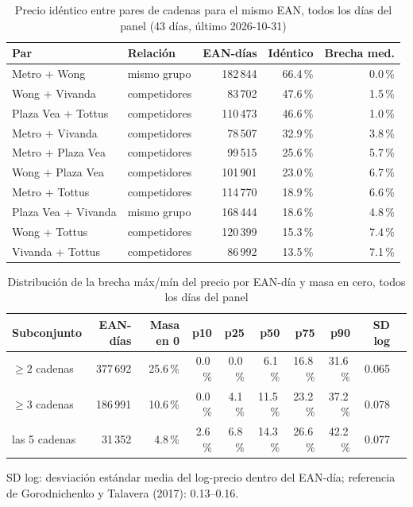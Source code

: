 
\begin{table}[htbp]
\caption{Precio id\'entico entre pares de cadenas para el mismo EAN, todos los d\'ias del panel (43 d\'ias, \'ultimo 2026-10-31)}
\label{tab:identidad}
\centering\scriptsize\setlength{\tabcolsep}{3pt}
\begin{tabular}{@{}llrrr@{}}
\toprule
Par & Relaci\'on & EAN-d\'ias & Id\'entico & Brecha med. \\
\midrule
Metro + Wong & mismo grupo & 182\,844 & 66.4\,\% & 0.0\,\% \\
Wong + Vivanda & competidores & 83\,702 & 47.6\,\% & 1.5\,\% \\
Plaza Vea + Tottus & competidores & 110\,473 & 46.6\,\% & 1.0\,\% \\
Metro + Vivanda & competidores & 78\,507 & 32.9\,\% & 3.8\,\% \\
Metro + Plaza Vea & competidores & 99\,515 & 25.6\,\% & 5.7\,\% \\
Wong + Plaza Vea & competidores & 101\,901 & 23.0\,\% & 6.7\,\% \\
Metro + Tottus & competidores & 114\,770 & 18.9\,\% & 6.6\,\% \\
Plaza Vea + Vivanda & mismo grupo & 168\,444 & 18.6\,\% & 4.8\,\% \\
Wong + Tottus & competidores & 120\,399 & 15.3\,\% & 7.4\,\% \\
Vivanda + Tottus & competidores & 86\,992 & 13.5\,\% & 7.1\,\% \\
\bottomrule\end{tabular}\end{table}

\begin{table}[t]
\caption{Distribuci\'on de la brecha m\'ax/m\'in del precio por EAN-d\'ia y masa en cero, todos los d\'ias del panel}
\label{tab:brecha}
\centering\scriptsize\setlength{\tabcolsep}{4pt}
\begin{tabular}{@{}lrrrrrrrrr@{}}
\toprule
Subconjunto & EAN-d\'ias & Masa en 0 & p10 & p25 & p50 & p75 & p90 & SD log \\
\midrule
$\geq 2$ cadenas & 377\,692 & 25.6\,\% & 0.0\,\% & 0.0\,\% & 6.1\,\% & 16.8\,\% & 31.6\,\% & 0.065 \\
$\geq 3$ cadenas & 186\,991 & 10.6\,\% & 0.0\,\% & 4.1\,\% & 11.5\,\% & 23.2\,\% & 37.2\,\% & 0.078 \\
las 5 cadenas & 31\,352 & 4.8\,\% & 2.6\,\% & 6.8\,\% & 14.3\,\% & 26.6\,\% & 42.2\,\% & 0.077 \\
\bottomrule\end{tabular}
\par\smallskip\raggedright\scriptsize SD log: desviaci\'on est\'andar media del log-precio dentro del EAN-d\'ia; referencia de Gorodnichenko y Talavera (2017): 0.13--0.16.
\end{table}

